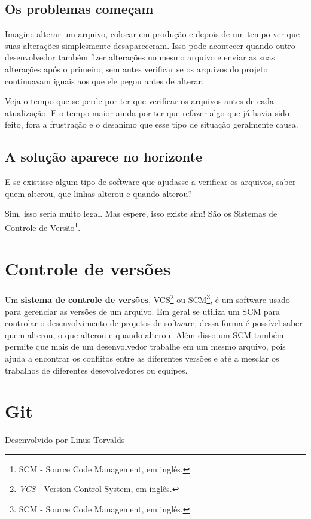 \documentclass[12pt,a4paper]{report}
\begin{document}
    \section{Os problemas começam}
        Imagine alterar um arquivo, colocar em produção e depois de um tempo ver
        que suas alterações simplesmente desapareceram. Isso pode acontecer quando
        outro desenvolvedor também fizer alterações no mesmo arquivo e enviar as
        suas alterações após o primeiro, sem antes verificar se os arquivos do
        projeto continuavam iguais aos que ele pegou antes de alterar.
        
        Veja o tempo que se perde por ter que verificar os arquivos antes de
        cada atualização. E o tempo maior ainda por ter que refazer algo que já
        havia sido feito, fora a frustração e o desanimo que esse tipo de
        situação geralmente causa.
    
    \section{A solução aparece no horizonte}
        E se existisse algum tipo de software que ajudasse a verificar os
        arquivos, saber quem alterou, que linhas alterou e quando alterou?
        
        Sim, isso seria muito legal. Mas espere, isso existe sim! São os
        Sistemas de Controle de Versão\footnote{SCM - Source Code Management,
        em inglês.}.

\chapter{Controle de versões}
    Um \textbf{sistema de controle de versões}, VCS\footnote{\textit{VCS} -
    Version Control System, em inglês.} ou SCM\footnote{SCM - Source Code
    Management, em inglês.}, é um software usado para gerenciar as
    versões de um arquivo. Em geral se utiliza um SCM para controlar o
    desenvolvimento de projetos de software, dessa forma é possível saber quem
    alterou, o que alterou e quando alterou. Além disso um SCM também permite
    que mais de um desenvolvedor trabalhe em um mesmo arquivo, pois ajuda a
    encontrar os conflitos entre as diferentes versões e até a mesclar os
    trabalhos de diferentes desevolvedores ou equipes.
    
\chapter{Git}
    Desenvolvido por Linus Torvalds
\end{document}
